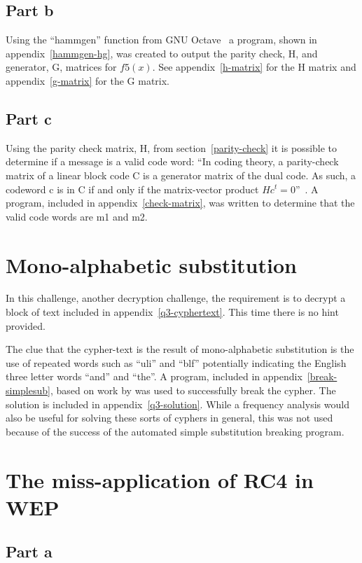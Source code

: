 \documentclass[pdftex, 12pt, a4paper]{article}
\begin{document}
\subsection{Part b}
Using the ``hammgen'' function from GNU Octave~\cite{hammgen-octave} a program,
shown in appendix~\ref{hammgen-hg}, was created to output the parity check,
H\label{parity-check}, and generator, G, matrices for $f5(x)$.
See appendix~\ref{h-matrix} for the H matrix and appendix~\ref{g-matrix} for the
G matrix.

\subsection{Part c}
Using the parity check matrix, H, from section~\ref{parity-check} it is possible
to determine if a message is a valid code word: ``In coding theory, a
parity-check matrix of a linear block code C is a generator matrix of the dual
code. As such, a codeword c is in C if and only if the matrix-vector product
$Hc^t = 0$''~\cite{check-matrix}. A program, included in
appendix~\ref{check-matrix}, was written to determine that the valid code words
are m1 and m2.

\section{Mono-alphabetic substitution}\label{mono}
In this challenge, another decryption challenge, the requirement is to decrypt a
block of text included in appendix~\ref{q3-cyphertext}. This time there is no
hint provided.

The clue that the cypher-text is the result of mono-alphabetic
substitution is the use of repeated words such as ``uli'' and ``blf''
potentially indicating the English three letter words ``and'' and ``the''.
A program, included in appendix~\ref{break-simplesub}, based on work by
\textcite{stochastic-searching} was used to successfully break the cypher.
The solution is included in appendix~\ref{q3-solution}.
While a frequency analysis would also be useful for solving these sorts of cyphers in
general, this was not used because of the success of the automated simple
substitution breaking program.

\section{The miss-application of RC4 in WEP}\label{conclusions}

\subsection{Part a}
\end{document}
